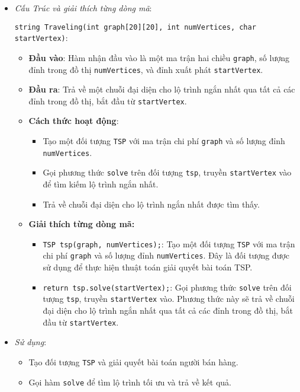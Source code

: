 \documentclass[a4paper]{article}
\begin{document}
\begin{itemize}
\item \textit{Cấu Trúc và giải thích từng dòng mã}:
\begin{itemize}
\texttt{string Traveling(int graph[20][20], int numVertices, char startVertex)}:
\end{itemize}
\begin{itemize}
    \item \textbf{Đầu vào}: Hàm nhận đầu vào là một ma trận hai chiều \texttt{graph}, số lượng đỉnh trong đồ thị \texttt{numVertices}, và đỉnh xuất phát \texttt{startVertex}.
    \item \textbf{Đầu ra}: Trả về một chuỗi đại diện cho lộ trình ngắn nhất qua tất cả các đỉnh trong đồ thị, bắt đầu từ \texttt{startVertex}.
    \item \textbf{Cách thức hoạt động}:
    \begin{itemize}
        \item Tạo một đối tượng \texttt{TSP} với ma trận chi phí \texttt{graph} và số lượng đỉnh \texttt{numVertices}.
        \item Gọi phương thức \texttt{solve} trên đối tượng \texttt{tsp}, truyền \texttt{startVertex} vào để tìm kiếm lộ trình ngắn nhất.
        \item Trả về chuỗi đại diện cho lộ trình ngắn nhất được tìm thấy.
    \end{itemize}
\end{itemize}
\begin{itemize}
\item \textbf{Giải thích từng dòng mã:}
\begin{itemize}
    \item \texttt{TSP tsp(graph, numVertices);}: Tạo một đối tượng \texttt{TSP} với ma trận chi phí \texttt{graph} và số lượng đỉnh \texttt{numVertices}. Đây là đối tượng được sử dụng để thực hiện thuật toán giải quyết bài toán TSP.
    \item \texttt{return tsp.solve(startVertex);}: Gọi phương thức \texttt{solve} trên đối tượng \texttt{tsp}, truyền \texttt{startVertex} vào. Phương thức này sẽ trả về chuỗi đại diện cho lộ trình ngắn nhất qua tất cả các đỉnh trong đồ thị, bắt đầu từ \texttt{startVertex}.
\end{itemize}
\end{itemize}
    \item \textit{Sử dụng}:
    \begin{itemize}
        \item Tạo đối tượng \texttt{TSP} và giải quyết bài toán người bán hàng.
        \item Gọi hàm \texttt{solve} để tìm lộ trình tối ưu và trả về kết quả.
    \end{itemize}
\end{itemize}
\end{document}
